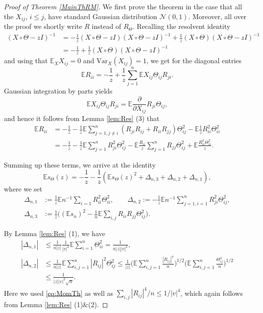 \documentclass[a4paper,12pt]{amsart}
\numberwithin{equation}{section}
\theoremstyle{remark}
\def\E{{\mathbb E}}
\begin{document}
\begin{proof}[Proof of Theorem \ref{MainThRM}]
We first prove the theorem in the case that all the $X_{ij}$, $i\le j$, have standard Gaussian distribution $\mathcal{N}(0,1)$. Moreover, all over the proof we shortly write $R$ instead of $R_\Theta$. Recalling the resolvent identity
\begin{align*}
    (X\circ \Theta -zI)^{-1} &= - \frac 1 z (X\circ \Theta -zI)(X\circ \Theta -zI)^{-1} + \frac 1 z (X\circ \Theta) (X\circ \Theta -zI)^{-1}\\
    &= - \frac 1 z +\frac 1 z (X\circ \Theta)  (X\circ \Theta-zI)^{-1}
\end{align*}
and using that $\E_X X_{ij} =0$ and $\mathrm{Var}_X(X_{ij}) = 1$, we get for the diagonal entries
 \[
 \E R_{ii}= - \frac 1 z + \frac 1 z \sum_{j=1}^n \E X_{ij} \Theta_{ij}R_{ji}.
 \]
Gaussian integration by parts yields
\[ \E X_{ij}\Theta_{ij} R_{ji}  = \E \frac {\partial} {\partial  X_{ij}} R_{ji} \Theta_{ij},
\]
and hence it follows from Lemma \ref{lem:Res} (3) that
\begin{align*}
 \E R_{ii} &= - \frac 1 z  -\frac 1 z \E \sum_{j=1, j \ne i}^n  (R_{ji} R_{ij} + R_{ii}R_{jj})\Theta_{ij}^2   - \E \frac 1 z R_{ii}^2\Theta_{ii}^2\\
 &=- \frac 1 z  -\frac {1}{z} \E \sum_{j=1}^n  R_{ji}^2 \Theta_{ij}^2 
 - \E \frac {R_{ii}} {z}  \sum_{j=1}^n R_{jj} \Theta_{ij}^2 + \E \frac {R_{ii}^2\Theta_{ii}^2}{z}.
\end{align*}

Summing up these terms, we arrive at the identity
\begin{equation}\label{eq:IdsTh}
\E s_\Theta(z) = -  \frac 1 z  -  \frac 1 z (\E s_\Theta(z)^2 + \Delta_{n,3}+ \Delta_{n,2} +\Delta_{n,1}),
\end{equation}
where we set
\begin{align*}
\Delta_{n,1} &:=  \frac 1 z \E n^{-1} \sum_{i=1} R_{ii}^2\Theta_{ii}^2, \qquad \Delta_{n,2} := -\frac  1 {z} \E n^{-1}\sum_{j=1,i=1}^n    R_{ji}^2 \Theta_{ij}^2,\\
\Delta_{n,3} &:= \frac 1 z \big( (\E s_n)^2 -  \frac 1 { n} \E \sum_{i,j} R_{ii} R_{jj} \Theta_{ij}^2\big). 
\end{align*}

By Lemma \ref{lem:Res} (1), we have
\begin{align*}
|\Delta_{n,1} |  & \le \frac {1} { n|z| } \frac{1}{|v|^2}  \E \sum_{i=1}^n \Theta_{ii}^2 = \frac {1} { n|z| |v|^2 },\\
|\Delta_{n,2}|  & \le  \frac {1} { n |z| } \E \sum_{i,j=1}^n |R_{ij}|^2 \Theta_{ij}^2 \le  \frac{1} {|z| } \Big(\E \sum_{i,j=1}^n \frac{|R_{ij}|^4}{n} \Big )^{1/2} \Big(\E \sum_{i,j=1}^n \frac{\Theta_{ij}^4}{n}\Big)^{1/2}\\
&\le \frac{1}{ |z|   |v|^2 \sqrt{n} }.
\end{align*}
Here we used \eqref{eq:MomTh} as well as $\sum_{i,j} |R_{ij}|^4/n \le 1/|v|^4$, which again follows from Lemma \ref{lem:Res} (1)\&(2).


\end{proof}
\end{document}
